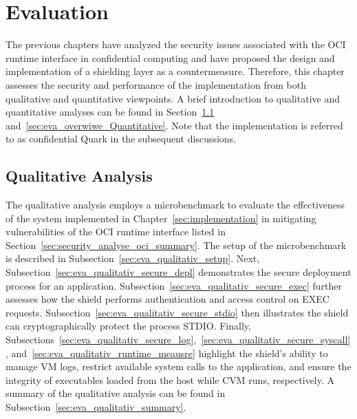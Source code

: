 \chapter{Evaluation}
\label{sec:evaluation}

The previous chapters have analyzed the security issues associated with the OCI runtime interface in confidential computing and have proposed the design and implementation of a shielding layer as a countermeasure. Therefore, this chapter assesses the security and performance of the implementation 
from both qualitative and quantitative viewpoints. A brief introduction to qualitative and quantitative analyses can be found in Section~\ref{sec:eva_qualitativ} and~\ref{sec:eva_overwiwe_Quantitative}.
Note that the implementation is referred to as confidential Quark in the subsequent discussions.


\section{Qualitative Analysis}
\label{sec:eva_qualitativ}
The qualitative analysis employs a microbenchmark to evaluate the effectiveness of the system implemented in Chapter~\ref{sec:implementation} in mitigating vulnerabilities of the OCI runtime interface listed in Section~\ref{sec:security_analyse_oci_summary}. The setup of the 
microbenchmark is described in Subsection~\ref{sec:eva_qualitativ_setup}. Next, Subsection~\ref{sec:eva_qualitativ_secure_depl} demonstrates the secure deployment process for an application. Subsection~\ref{sec:eva_qualitativ_secure_exec} further assesses how the shield performs authentication and access control on EXEC requests.
Subsection~\ref{sec:eva_qualitativ_secure_stdio} then illustrates the shield can cryptographically protect the process STDIO. Finally, Subsections~\ref{sec:eva_qualitativ_secure_log},~\ref{sec:eva_qualitativ_secure_syscall}, and~\ref{sec:eva_qualitativ_runtime_meausre}
highlight the shield's ability to manage VM logs, restrict available system calls to the application, and ensure the integrity of executables loaded from the host while \acrshort{CVM} runs, respectively. A summary of the qualitative analysis can be found in Subsection~\ref{sec:eva_qualitativ_summary}.


